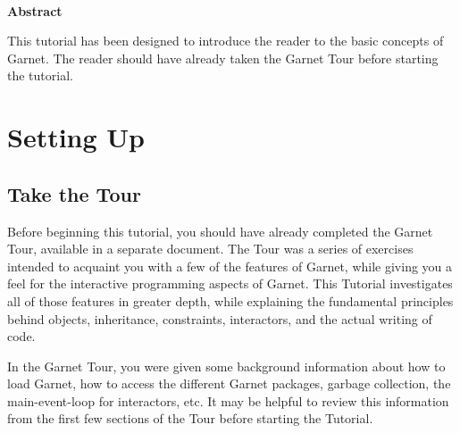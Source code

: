 
\begin{titlepage}
\vspace{0.6in}

 \\

\vspace{0.3in} 
\centering{\today{}}
  \vspace{0.5in}
  \begin{center} {\bf Abstract}\end{center}
  This tutorial has been designed to introduce the reader to the basic
  concepts of Garnet.  The reader should have already taken the Garnet
  Tour before starting the tutorial.  \vspace{0.5in}
  
\end{titlepage}

\tableofcontents{}


% 

\chapter{Setting Up}

\section{Take the Tour}

Before beginning this tutorial, you should have already completed the
Garnet Tour, available in a separate document.  The Tour was a series
of exercises intended to acquaint you with a few of the features of
Garnet, while giving you a feel for the interactive programming aspects
of Garnet.  This Tutorial investigates all of those features in
greater depth, while explaining the fundamental principles behind
objects, inheritance, constraints, interactors, and the actual writing
of code.

In the Garnet Tour, you were given some background information about
how to load Garnet, how to access the different Garnet packages,
garbage collection, the main-event-loop for interactors, etc.  It may
be helpful to review this information from the first few sections of
the Tour before starting the Tutorial.


